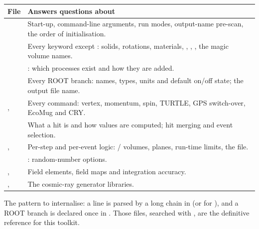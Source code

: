 {\tablestyle
\begin{tabularx}{\textwidth}{@{}>{\raggedright\arraybackslash}p{} L@{}}
\toprule
\textbf{File} & \textbf{Answers questions about}\\
\midrule
{} & Start-up, command-line arguments, run modes, output-name pre-scan, the order of initialisation.\\
 & Every  keyword except : solids, rotations, materials, , , , the magic volume names.\\
 & : which processes exist and how they are added.\\
 & Every ROOT branch: names, types, units and default on/off state; the output file name.\\
,  & Every  command: vertex, momentum, spin, TURTLE, GPS switch-over, EcoMug and CRY.\\
 & What a hit is and how  values are computed; hit merging and event selection.\\
,  & Per-step and per-event logic: / volumes,  planes, run-time limits, the  file.\\
 & : random-number options.\\
,  & Field elements, field maps and integration accuracy.\\
,  & The cosmic-ray generator libraries.\\
\bottomrule
\end{tabularx}}

\begin{keypoint}
The pattern to internalise: a  line is parsed by a long  chain in  (or  for ), and a ROOT branch is declared once in . Those files, searched with , are the definitive reference for this toolkit.
\end{keypoint}

